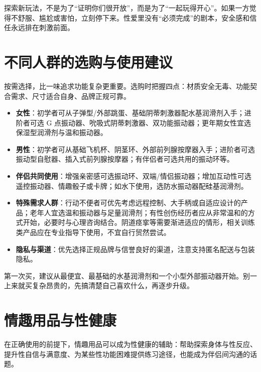 \documentclass[12pt,UTF8]{ctexbook}
\begin{document}
\begin{tcolorbox}[colback=pink!5!white,colframe=red!50!black,title=贴心小叮咛]
探索新玩法，不是为了“证明你们很开放”，而是为了“一起玩得开心”。如果一方觉得不舒服、尴尬或害怕，立刻停下来。性爱里没有“必须完成”的剧本，安全感和信任永远排在刺激前面。
\end{tcolorbox}

\section{不同人群的选购与使用建议}

按需选择，比一味追求功能复杂更重要。选购时把握四点：材质安全无毒、功能契合需求、尺寸适合自身、品牌正规可靠。

\begin{itemize}
\item \textbf{女性}：初学者可从子弹型/外部跳蛋、基础阴蒂刺激器配水基润滑剂入手；进阶者可选 G 点振动器、吮吸式阴蒂刺激器、双功能振动器；更年期女性宜选保湿型润滑剂与温和振动器。
\item \textbf{男性}：初学者可从基础飞机杯、阴茎环、外部前列腺按摩器入手；进阶者可选振动型自慰器、插入式前列腺按摩器；有伴侣者可选共用的振动环等。
\item \textbf{伴侣共同使用}：增强亲密感可选振动环、双端/情侣振动器；增加互动性可选遥控振动器、情趣骰子或卡牌；如水下使用，选防水振动器配硅基润滑剂。
\item \textbf{特殊需求人群}：行动不便者可优先考虑远程控制、大手柄或自适应设计的产品；老年人宜选温和振动器与足量润滑剂；有性创伤经历者应从非常温和的方式开始，必要时与心理咨询结合。阴道痉挛等需要渐进适应的情形，相关训练类产品应在专业指导下使用，不宜自行贸然尝试。
\item \textbf{隐私与渠道}：优先选择正规品牌与信誉良好的渠道，注意支持匿名配送与包装隐私。
\end{itemize}

\begin{tcolorbox}[colback=pink!5!white,colframe=red!50!black,title=贴心小叮咛]
第一次买，建议从最便宜、最基础的水基润滑剂和一个小型外部振动器开始。别一上来就买复杂昂贵的，先搞清楚自己喜欢什么，再逐步升级。
\end{tcolorbox}

\section{情趣用品与性健康}

在正确使用的前提下，情趣用品可以成为性健康的辅助：帮助探索身体与性反应、提升性自信与满意度、为某些性功能困难提供练习途径，也能成为伴侣间沟通的话题。
\end{document}
